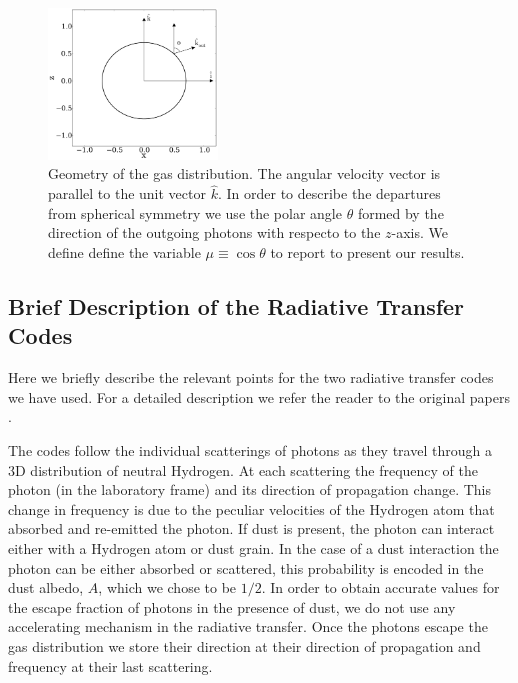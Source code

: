 \documentclass{emulateapj}
\newcommand{\ly}{{\ifmmode{{\rm Ly}\alpha~}\else{Ly$\alpha$~}\fi}}
\begin{document}
\begin{figure}
\begin{center}
  \includegraphics[width=0.4\textwidth]{f1.pdf}
\end{center}
\caption{Geometry of the gas distribution. The angular velocity vector
  is parallel to the unit vector $\hat{k}$. In order to describe the
  departures from spherical symmetry we use the polar angle $\theta$
  formed by the direction of the outgoing photons with respecto to the
  $z$-axis. We define define the variable $\mu\equiv\cos\theta$ to
  report to present our results.
    \label{fig:geometry}}  
\end{figure}



\subsection{Brief Description of the Radiative Transfer Codes}

Here we briefly describe the relevant points for the two radiative
transfer codes we have used. For a detailed description we refer the
reader to the original papers \cite{CLARA,DijkstraKramer}.

The codes follow the individual scatterings of \ly photons as they
travel through a 3D distribution of neutral Hydrogen. At each
scattering the frequency of the photon (in the laboratory frame) and
its direction of propagation change. This change in frequency is due
to the peculiar velocities of the Hydrogen atom that absorbed and
re-emitted the photon. If dust is present, the photon can interact
either with a Hydrogen atom or dust grain. In the case of a dust
interaction the photon can be either absorbed or scattered, this
probability is encoded in the dust albedo, $A$, which we chose to be
$1/2$. In order to obtain accurate values for the escape fraction of
photons in the presence of dust, we do not use any accelerating
mechanism in the radiative transfer. Once the photons escape the gas
distribution we store their direction at their direction of
propagation and frequency at their last scattering.
\end{document}
